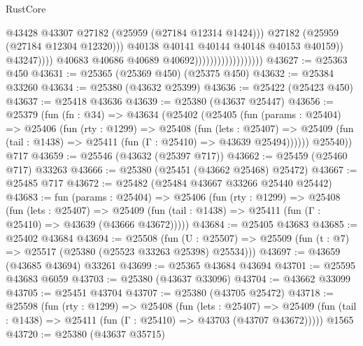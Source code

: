 \begin{lexlean}{RustCore}
\begin{coremodule}
                                                        @43428
                                                        @43307
                                                        @27182
                                                        (@25959 (@27184 @12314 @1424)))
                                                      @27182
                                                      (@25959 (@27184 @12304 @12320)))
                                                    @40138
                                                    @40141
                                                    @40144
                                                    @40148
                                                    @40153
                                                    @40159))
                                                @43247))))
                                        @40683
                                        @40686
                                        @40689
                                        @40692))))))))))))))))))
@43627 := @25363 @450
@43631 := @25365 (@25369 @450) (@25375 @450)
@43632 := @25384 @33260
@43634 := @25380 (@43632 @25399)
@43636 := @25422 (@25423 @450)
@43637 := @25418 @43636
@43639 := @25380 (@43637 @25447)
@43656 := @25379
    (fun (fn : @34) =>
    @43634
      (@25402
        (@25405
          (fun (params : @25404) =>
          @25406
            (fun (rty : @1299) =>
            @25408
              (fun (lets : @25407) =>
              @25409 (fun (tail : @1438) => @25411 (fun (Γ : @25410) => @43639 @25494))))))
        @25540))
    @717
@43659 := @25546 (@43632 (@25397 @717))
@43662 := @25459 (@25460 @717) @33263
@43666 := @25380 (@25451 (@43662 @25468) @25472)
@43667 := @25485 @717
@43672 := @25482 (@25484 @43667 @33266 @25440 @25442)
@43683 := fun (params : @25404) =>
  @25406
    (fun (rty : @1299) =>
    @25408
      (fun (lets : @25407) =>
      @25409 (fun (tail : @1438) => @25411 (fun (Γ : @25410) => @43639 (@43666 @43672)))))
@43684 := @25405 @43683
@43685 := @25402 @43684
@43694 := @25508
    (fun (U : @25507) => @25509 (fun (t : @7) => @25517 (@25380 (@25523 @33263 @25398) @25534)))
@43697 := @43659 (@43685 @43694) @33261
@43699 := @25365 @43684 @43694
@43701 := @25595 @43683 @6059
@43703 := @25380 (@43637 @33096)
@43704 := @43662 @33099
@43705 := @25451 @43704
@43707 := @25380 (@43705 @25472)
@43718 := @25598
    (fun (rty : @1299) =>
    @25408
      (fun (lets : @25407) =>
      @25409 (fun (tail : @1438) => @25411 (fun (Γ : @25410) => @43703 (@43707 @43672)))))
    @1565
@43720 := @25380 (@43637 @35715)

\end{coremodule}
\end{lexlean}
